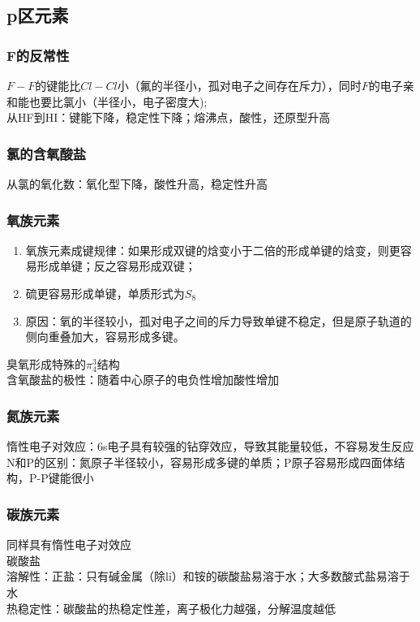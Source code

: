 \documentclass[utf8,a4paper,12pt]{ctexart}
\begin{document}
\subsection{p区元素}
\subsubsection{F的反常性}
$F-F$的键能比$Cl-Cl$小（氟的半径小，孤对电子之间存在斥力），同时$F$的电子亲和能也要比氯小（半径小，电子密度大);\\
从HF到HI：键能下降，稳定性下降；熔沸点，酸性，还原型升高\\
\subsubsection{氯的含氧酸盐}
从氯的氧化数：氧化型下降，酸性升高，稳定性升高\\
\subsubsection{氧族元素}
\begin{enumerate}[(1)]
\item 氧族元素成键规律：如果形成双键的焓变小于二倍的形成单键的焓变，则更容易形成单键；反之容易形成双键；
\item 硫更容易形成单键，单质形式为$S_8$
\item 原因：氧的半径较小，孤对电子之间的斥力导致单键不稳定，但是原子轨道的侧向重叠加大，容易形成多键。
\end{enumerate}
臭氧形成特殊的$\pi^3_4$结构\\
含氧酸盐的极性：随着中心原子的电负性增加酸性增加\\
\subsubsection{氮族元素}
惰性电子对效应：6s电子具有较强的钻穿效应，导致其能量较低，不容易发生反应\\
N和P的区别：氮原子半径较小，容易形成多键的单质；P原子容易形成四面体结构，P-P键能很小\\
\subsubsection{碳族元素}
同样具有惰性电子对效应\\
碳酸盐\\
溶解性：正盐：只有碱金属（除li）和铵的碳酸盐易溶于水；大多数酸式盐易溶于水\\
热稳定性：碳酸盐的热稳定性差，离子极化力越强，分解温度越低\\
\end{document}
